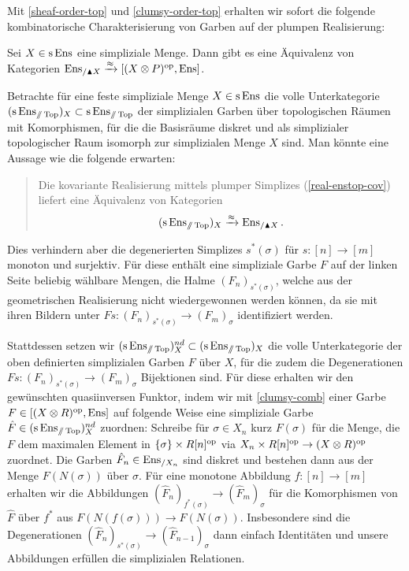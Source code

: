 Mit \ref{sheaf-order-top} und \ref{clumsy-order-top} erhalten wir
sofort die folgende kombinatorische Charakterisierung von Garben auf
der plumpen Realisierung:
\begin{prop} \label{clumsy-comb}
  Sei $X \in \operatorname{s}\operatorname{Ens}$ eine simpliziale Menge. Dann gibt es eine
  Äquivalenz von Kategorien $\operatorname{Ens}_{/\blacktriangle X} \xrightarrow{\approx} [(X
    \otimes P)^\mathrm{op}, \operatorname{Ens}]$.
\end{prop}
\begin{bem}
  Betrachte für eine feste simpliziale Menge $X \in \operatorname{s}\operatorname{Ens}$ die volle
  Unterkategorie $(\operatorname{s}\operatorname{Ens}_{\mathbin{/\mkern-6mu/} \operatorname{Top}})_X \subset \operatorname{s}\operatorname{Ens}_{\mathbin{/\mkern-6mu/} \operatorname{Top}}$ der
  simplizialen Garben über topologischen Räumen mit Komorphismen, für
  die die Basisräume diskret und als simplizialer topologischer Raum
  isomorph zur simplizialen Menge $X$ sind. Man könnte eine Aussage
  wie die folgende erwarten:
  \begin{quote}
    Die kovariante Realisierung mittels plumper Simplizes
    (\ref{real-enstop-cov}) liefert eine Äquivalenz von Kategorien
    \[ (\operatorname{s}\operatorname{Ens}_{\mathbin{/\mkern-6mu/} \operatorname{Top}})_X \xrightarrow{\approx} \operatorname{Ens}_{/\blacktriangle X}. \]
  \end{quote}
  Dies verhindern aber die degenerierten Simplizes $s^*(\sigma)$ für
  $s: [n] \to [m]$ monoton und surjektiv. Für diese enthält eine
  simpliziale Garbe $F$ auf der linken Seite beliebig wählbare Mengen,
  die Halme $(F_n)_{s^*(\sigma)}$, welche aus der geometrischen
  Realisierung nicht wiedergewonnen werden können, da sie mit ihren
  Bildern unter $Fs: (F_n)_{s^*(\sigma)} \to (F_m)_\sigma$
  identifiziert werden.

  Stattdessen setzen wir $(\operatorname{s}\operatorname{Ens}_{\mathbin{/\mkern-6mu/} \operatorname{Top}})_X^{nd} \subset
  (\operatorname{s}\operatorname{Ens}_{\mathbin{/\mkern-6mu/} \operatorname{Top}})_X$ die volle Unterkategorie der oben definierten
  simplizialen Garben $F$ über $X$, für die zudem die Degenerationen
  $Fs: (F_n)_{s^*(\sigma)} \to (F_m)_\sigma$ Bijektionen sind. Für
  diese erhalten wir den gewünschten quasiinversen Funktor, indem wir
  mit \ref{clumsy-comb} einer Garbe $F \in [(X \otimes R)^\mathrm{op}, \operatorname{Ens}]$
  auf folgende Weise eine simpliziale Garbe $\hat{F} \in
  (\operatorname{s}\operatorname{Ens}_{\mathbin{/\mkern-6mu/} \operatorname{Top}})_X^{nd}$ zuordnen: Schreibe für $\sigma \in X_n$ kurz
  $F(\sigma)$ für die Menge, die $F$ dem maximalen Element in
  $\{\sigma\} \times R[n]^\mathrm{op}$ via $X_n \times R[n]^\mathrm{op} \to (X \otimes
  R)^\mathrm{op}$ zuordnet. Die Garben $\hat{F}_n \in \operatorname{Ens}_{/X_n}$ sind diskret
  und bestehen dann aus der Menge $F(N(\sigma))$ über $\sigma$. Für
  eine monotone Abbildung $f: [n] \to [m]$ erhalten wir die
  Abbildungen $(\hat{F}_n)_{f^*(\sigma)} \to (\hat{F}_{m})_\sigma$ für
  die Komorphismen von $\hat{F}$ über $f^*$ aus $F(N(f(\sigma))) \to
  F(N(\sigma))$. Insbesondere sind die Degenerationen
  $(\hat{F}_n)_{s^*(\sigma)} \to (\hat{F}_{n-1})_\sigma$ dann einfach
  Identitäten und unsere Abbildungen erfüllen die simplizialen
  Relationen.
\end{bem}

